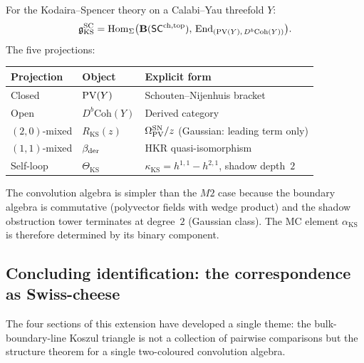 \begin{computation}
For the Kodaira--Spencer theory on a Calabi--Yau threefold $Y$:
\begin{equation}%
\gSC_{\mathrm{KS}}
= \Hom_{\Sigma}\bigl(
\mathbf{B}(\SCop),\,
\End_{(\PV(Y),\,D^b\mathrm{Coh}(Y))}
\bigr).
\end{equation}
The five projections:
\begin{center}
\renewcommand{\arraystretch}{1.25}
\begin{tabular}{lll}
\textbf{Projection} & \textbf{Object} & \textbf{Explicit form} \\
\hline
Closed & $\operatorname{PV}(Y)$ & Schouten--Nijenhuis bracket \\
Open & $D^b\mathrm{Coh}(Y)$ & Derived category \\
$(2,0)$-mixed & $R_{\mathrm{KS}}(z)$
& $\Omega_{\operatorname{PV}}^{\mathrm{SN}}/z$ (Gaussian: leading term only) \\
$(1,1)$-mixed & $\beta_{\mathrm{der}}$
& HKR quasi-isomorphism \\
Self-loop & $\Theta_{\mathrm{KS}}$
& $\kappa_{\mathrm{KS}}=h^{1,1}-h^{2,1}$, shadow depth~$2$
\end{tabular}
\end{center}
The convolution algebra is simpler than the $M2$ case because
the boundary algebra is commutative (polyvector fields with
wedge product) and the shadow obstruction tower terminates at degree~$2$
(Gaussian class). The MC element $\alpha_{\mathrm{KS}}$ is
therefore determined by its binary component.
\end{computation}


\subsection{Concluding identification: the correspondence as Swiss-cheese}

The four sections of this extension have developed a single theme:
the bulk-boundary-line Koszul triangle is not a collection of
pairwise comparisons but the structure theorem for a single
two-coloured convolution algebra.

